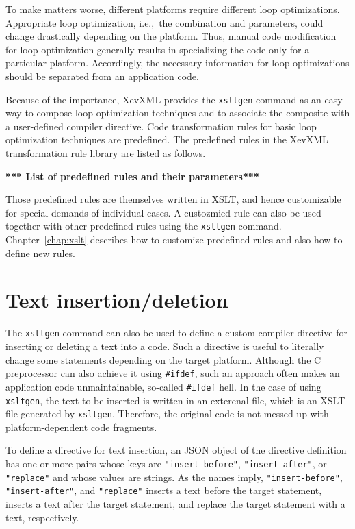 To make matters worse, different platforms require different loop
optimizations.  Appropriate loop optimization, i.e.,~the combination and
parameters, could change drastically depending on the platform.  Thus,
manual code modification for loop optimization generally results in
specializing the code only for a particular platform. Accordingly, the
necessary information for loop optimizations should be separated from an
application code.

Because of the importance, XevXML provides the \texttt{xsltgen} command
as an easy way to compose loop optimization techniques and to associate
the composite with a user-defined compiler directive.  Code
transformation rules for basic loop optimization techniques are
predefined. The predefined rules in the XevXML transformation rule
library are listed as follows.

\textbf{*** List of predefined rules and their parameters***}

Those predefined rules are themselves written in XSLT, and hence
customizable for special demands of individual cases. A custozmied rule
can also be used together with other predefined rules using the
\texttt{xsltgen} command. Chapter~\ref{chap:xslt} describes how to
customize predefined rules and also how to define new rules.


\section{Text insertion/deletion}
The \texttt{xsltgen} command can also be used to define a custom
compiler directive for inserting or deleting a text into a code. Such a
directive is useful to literally change some statements depending on the
target platform.  Although the C preprocessor can also achieve it using
\texttt{\#ifdef}, such an approach often makes an application code
unmaintainable, so-called \texttt{\#ifdef} hell. In the case of using
\texttt{xsltgen}, the text to be inserted is written in an exterenal
file, which is an XSLT file generated by \texttt{xsltgen}.  Therefore,
the original code is not messed up with platform-dependent code
fragments.

To define a directive for text insertion, an JSON object of the
directive definition has one or more pairs whose keys are
\texttt{"insert-before"}, \texttt{"insert-after"}, or \texttt{"replace"}
and whose values are strings. As the names imply,
\texttt{"insert-before"}, \texttt{"insert-after"}, and
\texttt{"replace"} inserts a text before the target statement, inserts a
text after the target statement, and replace the target statement with a
text, respectively.  

